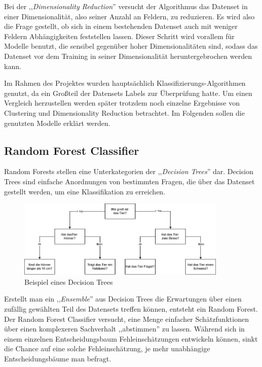 Bei der ,,\textit{Dimensionality Reduction}'' versucht der Algorithmus das Datenset in einer 
Dimensionalität, also seiner Anzahl an Feldern, zu reduzieren. Es wird also die Frage gestellt, 
ob sich in einem bestehenden Datenset auch mit weniger Feldern Abhängigkeiten feststellen lassen. Dieser 
Schritt wird vorallem für Modelle benutzt, die sensibel gegenüber hoher Dimensionalitäten sind, 
sodass das Datenset vor dem Training in seiner Dimensionalität heruntergebrochen werden kann.

Im Rahmen des Projektes wurden hauptsächlich Klassifizierungs-Algorithmen genutzt, da ein Großteil der 
Datensets Labels zur Überprüfung hatte. Um einen Vergleich herzustellen werden später trotzdem noch 
einzelne Ergebnisse von Clustering und Dimensionality Reduction betrachtet. Im Folgenden sollen die genutzten 
Modelle erklärt werden.

\subsection{Random Forest Classifier}

Random Forests stellen eine Unterkategorien der ,,\textit{Decision Trees}'' dar. Decision Trees sind einfache
Anordnungen von bestimmten Fragen, die über das Datenset gestellt werden, um eine Klassifikation zu erreichen.

\begin{figure}[h]
    \centering
    \includegraphics[width=10.0cm]{pic/DecisionTree.png}
    \caption{Beispiel eines Decision Trees}
    \label{fig:DT_Beispiel}
\end{figure}

Erstellt man ein ,,\textit{Ensemble}'' aus Decision Trees die Erwartungen über einen zufällig gewählten 
Teil des Datensets treffen können, entsteht ein Random Forest.
Der Random Forest Classifier versucht, eine Menge einfacher Schätzfunktionen über einen komplexeren 
Sachverhalt ,,abstimmen'' zu lassen. Während sich in einem einzelnen Entscheidungsbaum Fehleinschätzungen 
entwickeln können, sinkt die Chance auf eine solche Fehleinschätzung, je mehr unabhängige 
Entscheidungsbäume man befragt. 

